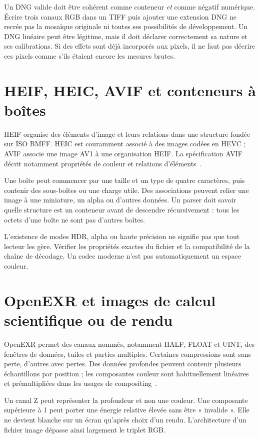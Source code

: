 Un DNG valide doit être cohérent comme conteneur \emph{et}
comme négatif numérique. Écrire trois canaux RGB dans un TIFF
puis ajouter une extension DNG ne recrée pas la mosaïque
originale ni toutes ses possibilités de développement.
Un DNG linéaire peut être légitime, mais il doit déclarer
correctement sa nature et ses calibrations. Si des effets
sont déjà incorporés aux pixels, il ne faut pas décrire
ces pixels comme s'ils étaient encore les mesures brutes.

\section{HEIF, HEIC, AVIF et conteneurs à boîtes}
HEIF organise des éléments d'image et leurs relations dans
une structure fondée sur ISO BMFF. HEIC est couramment
associé à des images codées en HEVC ; AVIF associe une image
AV1 à une organisation HEIF. La spécification AVIF décrit
notamment propriétés de couleur et relations d'éléments~\cite{avif}.

Une boîte peut commencer par une taille et un type de quatre
caractères, puis contenir des sous-boîtes ou une charge utile.
Des associations peuvent relier une image à une miniature,
un alpha ou d'autres données. Un parser doit savoir quelle
structure est un conteneur avant de descendre récursivement :
tous les octets d'une boîte ne sont pas d'autres boîtes.

L'existence de modes HDR, alpha ou haute précision ne signifie
pas que tout lecteur les gère. Vérifier les propriétés exactes
du fichier et la compatibilité de la chaîne de décodage.
Un codec moderne n'est pas automatiquement un espace couleur.

\section{OpenEXR et images de calcul scientifique ou de rendu}
OpenEXR permet des canaux nommés, notamment HALF, FLOAT et
UINT, des fenêtres de données, tuiles et parties multiples.
Certaines compressions sont sans perte, d'autres avec
pertes. Des données profondes peuvent contenir plusieurs
échantillons par position ; les composantes couleur sont
habituellement linéaires et prémultipliées dans les usages
de compositing~\cite{openexr}.

Un canal Z peut représenter la profondeur et non une couleur.
Une composante supérieure à 1 peut porter une énergie
relative élevée sans être « invalide ». Elle ne devient
blanche sur un écran qu'après choix d'un rendu. L'architecture
d'un fichier image dépasse ainsi largement le triplet RGB.

